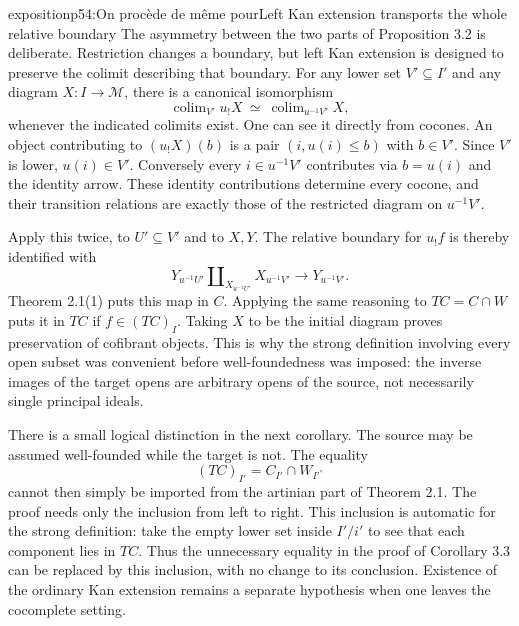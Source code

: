 \begin{dcomment}{exposition}{p54:On procède de même pour}{Left Kan extension transports the whole relative boundary}
The asymmetry between the two parts of Proposition 3.2 is deliberate. Restriction changes a boundary, but left Kan extension is designed to preserve the colimit describing that boundary. For any lower set $V'\subseteq I'$ and any diagram $X:I\to\mathcal M$, there is a canonical isomorphism
\[
 \operatorname{colim}_{V'}u_!X
 \ \simeq\ \operatorname{colim}_{u^{-1}V'}X,
\]
whenever the indicated colimits exist. One can see it directly from cocones. An object contributing to $(u_!X)(b)$ is a pair $(i,u(i)\leq b)$ with $b\in V'$. Since $V'$ is lower, $u(i)\in V'$. Conversely every $i\in u^{-1}V'$ contributes via $b=u(i)$ and the identity arrow. These identity contributions determine every cocone, and their transition relations are exactly those of the restricted diagram on $u^{-1}V'$.

Apply this twice, to $U'\subseteq V'$ and to $X,Y$. The relative boundary for $u_!f$ is thereby identified with
\[
 Y_{u^{-1}U'}\amalg_{X_{u^{-1}U'}}X_{u^{-1}V'}
       \longrightarrow Y_{u^{-1}V'}.
\]
Theorem 2.1(1) puts this map in $C$. Applying the same reasoning to $TC=C\cap W$ puts it in $TC$ if $f\in(TC)_I$. Taking $X$ to be the initial diagram proves preservation of cofibrant objects. This is why the strong definition involving every open subset was convenient before well-foundedness was imposed: the inverse images of the target opens are arbitrary opens of the source, not necessarily single principal ideals.

There is a small logical distinction in the next corollary. The source may be assumed well-founded while the target is not. The equality
\[
 (TC)_{I'}=C_{I'}\cap W_{I'^\circ}
\]
cannot then simply be imported from the artinian part of Theorem 2.1. The proof needs only the inclusion from left to right. This inclusion is automatic for the strong definition: take the empty lower set inside $I'/i'$ to see that each component lies in $TC$. Thus the unnecessary equality in the proof of Corollary 3.3 can be replaced by this inclusion, with no change to its conclusion. Existence of the ordinary Kan extension remains a separate hypothesis when one leaves the cocomplete setting.
\end{dcomment}

